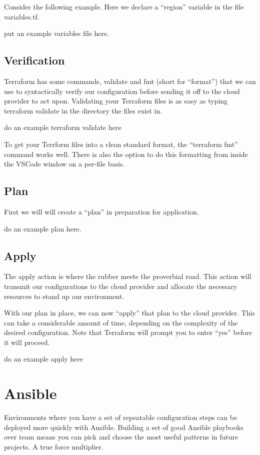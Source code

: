 \justifying
Consider the following example. Here we declare a ``region'' variable in the file variables.tf.

put an example variables file here.

\subsection{Verification}

\justifying
Terraform has some commands, validate and fmt (short for ``format'') that we can use to syntactically
verify our configuration before sending it off to the cloud provider to act upon. Validating your
Terraform files is as easy as typing terraform validate in the directory the files exist in.

do an example terraform validate here

To get your Terrform files into a clean standard format, the ``terraform fmt'' command works well.
There is also the option to do this formatting from inside the VSCode window on a per-file basis.

\subsection{Plan}

First we will will create a ``plan'' in preparation for application.

do an example plan here.

\subsection{Apply}

The apply action is where the rubber meets the proverbial road. This action will transmit our
configurations to the cloud provider and allocate the necessary resources to stand up our environment.

With our plan in place, we can now ``apply'' that plan to the cloud provider. This can take a
considerable amount of time, depending on the complexity of the desired configuration. Note that
Terraform will prompt you to enter ``yes'' before it will proceed.

do an example apply here

\section{Ansible}

\justifying
Environments where you have a set of repeatable configuration steps can be deployed more quickly with
Ansible. Building a set of good Ansible playbooks over team means you can pick and choose the most
useful patterns in future projects. A true force multiplier.

